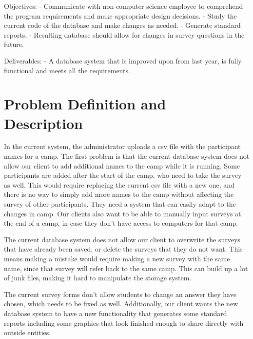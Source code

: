 \documentclass[onecolumn, draftclsnofoot,10pt, compsoc]{IEEEtran}
\begin{document}
Objectives: \newline
- Communicate with non-computer science employee to comprehend the program requirements and make appropriate design decisions.\newline
- Study the current code of the database and make changes as needed. \newline
- Generate standard reports. \newline
- Resulting database should allow for changes in survey questions in the future.\newline\newline

Deliverables: \newline
- A database system that is improved upon from last year, is fully functional and meets all the requirements.\newline\newline


\section{Problem Definition and Description}
In the current system, the administrator uploads a csv file with the participant names for a camp. The first problem is that the current database system does not allow our client to add additional names to the camp while it is running. Some participants are added after the start of the camp, who need to take the survey as well. This would require replacing the current csv file with a new one, and there is no way to simply add more names to the camp without affecting the survey of other participants. They need a system that can easily adapt to the changes in camp. Our clients also want to be able to manually input surveys at the end of a camp, in case they don\rq t have access to computers for that camp.
\newline

The current database system does not allow our client to overwrite the surveys that have already been saved, or delete the surveys that they do not want. This means making a mistake would require making a new survey with the same name, since that survey will refer back to the same camp. This can build up a lot of junk files, making it hard to manipulate the storage system. 
\newline

The current survey forms don\rq t allow students to change an answer they have chosen, which needs to be fixed as well. Additionally, our client wants the new database system to have a new functionality that generates some standard reports including some graphics that look finished enough to share directly with outside entities.
\newline\newline
\end{document}
